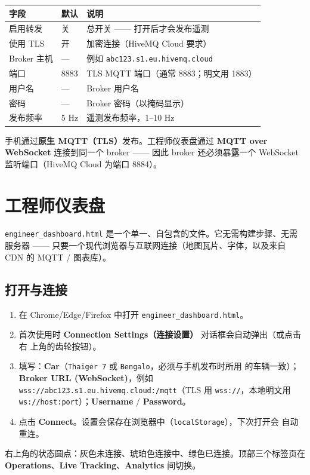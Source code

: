 \documentclass[11pt,a4paper,oneside]{report}
\newcommand{\code}[1]{\texttt{#1}}
\begin{document}
\begin{tabularx}{\linewidth}{@{}llL@{}}
\toprule
\textbf{字段} & \textbf{默认} & \textbf{说明}\\
\midrule
启用转发 & 关 & 总开关 —— 打开后才会发布遥测\\
使用 TLS & 开 & 加密连接（HiveMQ Cloud 要求）\\
Broker 主机 & --- & 例如 \code{abc123.s1.eu.hivemq.cloud}\\
端口 & 8883 & TLS MQTT 端口（通常 8883；明文用 1883）\\
用户名 & --- & Broker 用户名\\
密码 & --- & Broker 密码（以掩码显示）\\
发布频率 & 5 Hz & 遥测发布频率，1--10 Hz\\
\bottomrule
\end{tabularx}
\begin{tgnote}
手机通过\textbf{原生 MQTT（TLS）}发布。工程师仪表盘通过 \textbf{MQTT over WebSocket}
连接到同一个 broker —— 因此 broker 还必须暴露一个 WebSocket 监听端口（HiveMQ Cloud
为端口 8884）。
\end{tgnote}

\section{工程师仪表盘}
\code{engineer\_dashboard.html} 是一个单一、自包含的文件。它无需构建步骤、无需服务器
—— 只要一个现代浏览器与互联网连接（地图瓦片、字体，以及来自 CDN 的 MQTT / 图表库）。

\subsection{打开与连接}
\begin{enumerate}
  \item 在 Chrome/Edge/Firefox 中打开 \code{engineer\_dashboard.html}。
  \item 首次使用时 \textbf{Connection Settings（连接设置）} 对话框会自动弹出（或点击右
    上角的齿轮按钮）。
  \item 填写：\textbf{Car}（\code{Thaiger 7} 或 \code{Bengalo}，必须与手机发布时所用
    的车辆一致）；\textbf{Broker URL (WebSocket)}，例如
    \code{wss://abc123.s1.eu.hivemq.cloud:/mqtt}（TLS 用 \code{wss://}，本地明文用
    \code{ws://host:port}）；\textbf{Username} / \textbf{Password}。
  \item 点击 \textbf{Connect}。设置会保存在浏览器中（\code{localStorage}），下次打开会
    自动重连。
\end{enumerate}
右上角的状态圆点：灰色未连接、琥珀色连接中、绿色已连接。顶部三个标签页在
\textbf{Operations}、\textbf{Live Tracking}、\textbf{Analytics} 间切换。
\end{document}
